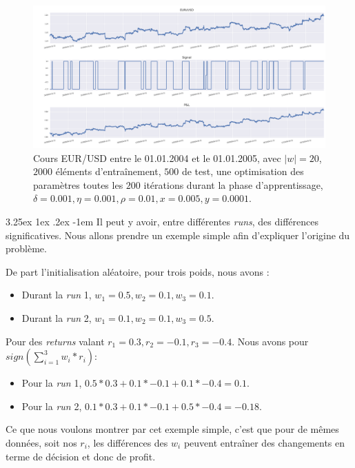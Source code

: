 \documentclass[a4paper, 11pt]{article}
\makeatletter
\renewcommand\paragraph{\@startsection{paragraph}{5}{\z@}%
  {3.25ex \@plus1ex \@minus.2ex}%
  {-1em}%
  {\normalfont\normalsize\bfseries}}
\makeatother
\begin{document}
 \begin{figure}
	\centering
	\includegraphics[scale=0.5]{res/eursud_2004-2005_from_40000to_50000}
	\caption[Blup]{Cours EUR/USD entre le 01.01.2004 et le 01.01.2005, avec $|w| = 20$, $2000$ éléments d'entraînement, $500$ de test, une optimisation des
		paramètres toutes les $200$ itérations durant la phase d'apprentissage, $\delta = 0.001, \eta=0.001,\rho=0.01, x = 0.005, y=0.0001$.}
\end{figure}
\clearpage

\paragraph{}
Il peut y avoir, entre différentes \textit{runs}, des différences significatives. Nous allons prendre un exemple simple afin d'expliquer l'origine du problème.

De part l'initialisation aléatoire, pour trois poids, nous avons :
\begin{itemize}
	\item Durant la \textit{run} 1, $w_1=0.5,w_2=0.1,w_3=0.1$.
	\item Durant la \textit{run} 2, $w_1=0.1,w_2=0.1,w_3=0.5$.
\end{itemize}

Pour des \textit{returns} valant $r_1=0.3,r_2=-0.1,r_3=-0.4$. Nous avons pour $sign(\sum_{i=1}^{3}w_i * r_i)$:
\begin{itemize}
	\item Pour la \textit{run} 1, $0.5 * 0.3 + 0.1 * -0.1 + 0.1 * -0.4 = 0.1$.
	\item Pour la \textit{run} 2, $0.1 * 0.3 + 0.1 * -0.1 + 0.5 * -0.4 = -0.18$.
\end{itemize}

Ce que nous voulons montrer par cet exemple simple, c'est que pour de mêmes données, soit nos $r_i$, les différences des $w_i$ peuvent entraîner des changements en terme de décision et donc de profit.
\end{document}
